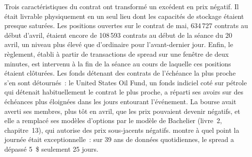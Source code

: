 Trois caractéristiques du contrat ont transformé un excédent en prix négatif. Il était
livrable physiquement en un seul lieu dont les capacités de stockage étaient presque saturées. Les positions
ouvertes sur le contrat de mai, 634\,727 contrats au début d'avril, étaient encore de
108\,593 contrats au début de la séance du 20 avril, un niveau plus élevé que d'ordinaire
pour l'avant-dernier jour. Enfin, le règlement, établi à partir de transactions de spread sur une
fenêtre de deux minutes, est intervenu à la fin de la séance au cours de laquelle ces positions étaient clôturées.
Les fonds détenant des contrats de l'échéance la plus proche s'en sont détournés~: le United States Oil Fund,
un fonds indiciel coté sur pétrole qui détenait habituellement le contrat le plus proche, a réparti
ses avoirs sur des échéances plus éloignées dans les jours entourant l'événement. La bourse avait averti
ses membres, plus tôt en avril, que les prix pouvaient devenir négatifs, et elle a remplacé
ses modèles d'options par le modèle de Bachelier (livre~2, chapitre~13), qui autorise
des prix sous-jacents négatifs.  montre à quel point la journée
était exceptionnelle~: sur 39 ans de données quotidiennes, le spread a dépassé 5~\$ seulement
25 jours.

\begin{omfigure}

\label{fig:m3:crude-oil:spread}
\end{omfigure}

